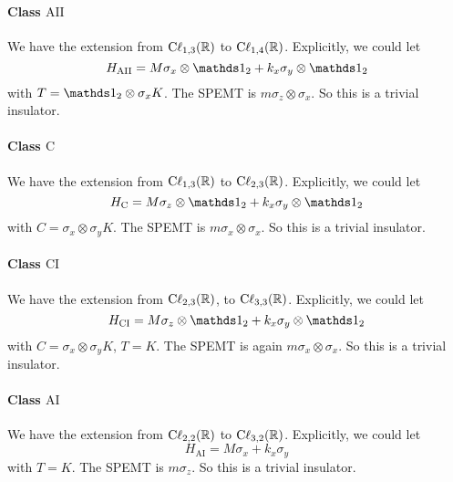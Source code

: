 \paragraph{Class $\mathrm{AII}$} We have the extension from
$\mathrm{C\ell}_{1,3}(\mathbb{R})$ to $\mathrm{C\ell}_{1,4}(\mathbb{R})$.
Explicitly, we could let
\begin{equation}
    H_{\mathrm{AII}} = M\sigma_x\otimes\id_2 + k_x\sigma_y\otimes\id_2
\end{equation}
with $T=\id_2\otimes\sigma_x K$. The SPEMT is $m\sigma_z\otimes\sigma_x$. So
this is a trivial insulator.

\paragraph{Class $\mathrm{C}$} We have the extension from
$\mathrm{C\ell}_{1,3}(\mathbb{R})$ to $\mathrm{C\ell}_{2,3}(\mathbb{R})$. Explicitly, we
could let
\begin{equation}
    H_{\mathrm{C}} = M\sigma_z\otimes\id_2 + k_x\sigma_y\otimes\id_2
\end{equation}
with $C=\sigma_x\otimes\sigma_y K$. The SPEMT is $m\sigma_x\otimes\sigma_x$. So
this is a trivial insulator.

\paragraph{Class $\mathrm{CI}$} We have the extension from
$\mathrm{C\ell}_{2,3}(\mathbb{R})$, to $\mathrm{C\ell}_{3,3}(\mathbb{R})$. Explicitly, we
could let
\begin{equation}
    H_{\mathrm{CI}} = M\sigma_z\otimes\id_2 + k_x\sigma_y\otimes\id_2
\end{equation}
with $C=\sigma_x\otimes\sigma_y K$, $T=K$. The SPEMT is again
$m\sigma_x\otimes\sigma_x$. So this is a trivial insulator.

\paragraph{Class $\mathrm{AI}$} We have the extension from
$\mathrm{C\ell}_{2,2}(\mathbb{R})$ to $\mathrm{C\ell}_{3,2}(\mathbb{R})$. Explicitly, we could let
\begin{equation}
    H_{\mathrm{AI}} = M\sigma_x + k_x\sigma_y
\end{equation}
with $T=K$. The SPEMT is $m\sigma_z$. So this is a trivial insulator.

